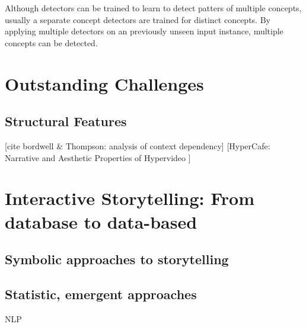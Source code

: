 Although detectors can be trained to learn to detect patters of multiple concepts, usually a separate concept detectors are trained for distinct concepts. By applying multiple detectors on an previously unseen input instance, multiple concepts can be detected.



\section{Outstanding Challenges} %
\label{sec:outstanding_challenges}






\subsection{Structural Features}

[cite bordwell \& Thompson: analysis of context dependency]
[HyperCafe: Narrative and Aesthetic Properties of Hypervideo \cite{Sawhney:1996tk}]


\section{Interactive Storytelling: From database to data-based}

\subsection{Symbolic approaches to storytelling}
\cite{Vilmos:2011wv,RodrigoLaiolaGuimaraes:2011tl,Ursu:2009gc}

\subsection{Statistic, emergent approaches}
\label{sec:statistic}

NLP

